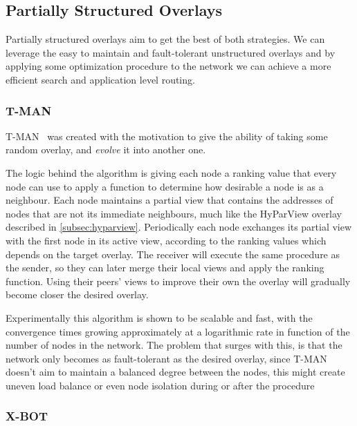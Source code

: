\subsection{Partially Structured Overlays}\label{sub:partially_structured_overlays}

Partially structured overlays aim to get the best of both strategies. We can 
leverage the easy to maintain and fault-tolerant unstructured overlays and
by applying some optimization procedure to the network we can achieve a more
efficient search and application level routing.

\subsubsection{T-MAN}\label{subsec:t-man}

T-MAN~\cite{tman} was created with the motivation to give
the ability of taking some random overlay, and \textit{evolve} it into another one.

The logic behind the algorithm is giving each node a ranking value that every node can
use to apply a function to determine how desirable a node is as a neighbour.
Each node maintains a partial view that contains the addresses of nodes that are not its
immediate neighbours, much like the HyParView overlay described in \ref{subsec:hyparview}.
Periodically each node exchanges its partial view with the first node in its active view,
according to the ranking
values which depends on the target overlay. The receiver will execute the same procedure
as the sender, so they can later merge their local views and apply the ranking function.
Using their peers' views to improve their own the overlay will gradually become closer
the desired overlay.

Experimentally this algorithm is shown to be scalable and fast, with the convergence
times growing approximately at a logarithmic rate in function of the number of nodes in
the network. The problem that surges with this, is that the network only becomes as 
fault-tolerant as the desired overlay, since T-MAN doesn't aim to maintain a balanced degree
between the nodes, this might create uneven load balance or even node isolation during
or after the procedure

\subsubsection{X-BOT}\label{subsec:x-bot}


